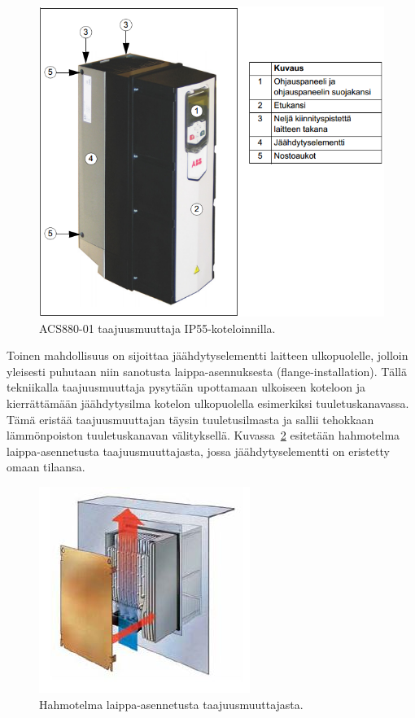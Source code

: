 \documentclass[finnish,12pt,a4paper,pdftex,elec,utf8]{aaltothesis}
\begin{document}
\begin{figure}[H]
	\begin{center}
	\includegraphics[scale=0.9]{IP55}
	\end{center}
	\caption{ACS880-01 taajuusmuuttaja IP55-koteloinnilla.
		 \cite[s. 28]{880hwman}}
	\label{fig:IP55}
\end{figure}

\noindent
Toinen mahdollisuus on sijoittaa jäähdytyselementti laitteen ulkopuolelle, jolloin yleisesti puhutaan niin sanotusta laippa-asennuksesta (flange-installation). Tällä tekniikalla taajuusmuuttaja pysytään upottamaan ulkoiseen koteloon ja kierrättämään jäähdytysilma kotelon ulkopuolella esimerkiksi tuuletuskanavassa. Tämä eristää taajuusmuuttajan täysin tuuletusilmasta ja sallii tehokkaan lämmönpoiston tuuletuskanavan välityksellä. Kuvassa~\ref{fig:flange} esitetään hahmotelma laippa-asennetusta taajuusmuuttajasta, jossa jäähdytyselementti on eristetty omaan tilaansa.

\begin{figure}[H]
	\begin{center}
	\includegraphics{flange}
	\end{center}
	\caption{Hahmotelma laippa-asennetusta taajuusmuuttajasta.
		 \cite[s. 6]{danfoss}}
	\label{fig:flange}
\end{figure}
\end{document}
